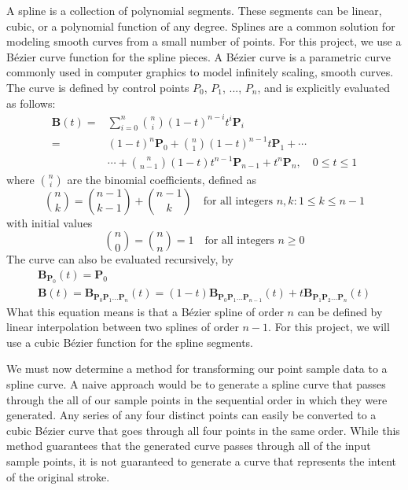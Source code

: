 A spline is a collection of polynomial segments.
These segments can be linear, cubic, or a polynomial function of any degree.
Splines are a common solution for modeling smooth curves from a small number of points.
For this project, we use a B\'{e}zier curve function for the spline pieces.
A B\'{e}zier curve is a parametric curve commonly used in computer graphics to model infinitely scaling, smooth curves.
The curve is defined by control points $P_0$, $P_1$, ..., $P_n$, and is explicitly evaluated as follows:
\begin{align}
  \mathbf{B}(t) = {} &\sum_{i=0}^n {n\choose i}(1 - t)^{n - i}t^i\mathbf{P}_i \\
                = {} &(1 - t)^n\mathbf{P}_0 + {n\choose 1}(1 - t)^{n - 1}t\mathbf{P}_1 + \cdots \\
                  {} &\cdots + {n\choose n - 1}(1 - t)t^{n - 1}\mathbf{P}_{n - 1} + t^n\mathbf{P}_n,\quad 0 \le t \le 1
\end{align}
where $\scriptstyle {n \choose i}$ are the binomial coefficients, defined as
\begin{equation}
\binom nk = \binom{n-1}{k-1} + \binom{n-1}k \quad \text{for all integers }n,k : 1\le k\le n-1
\end{equation}
with initial values 
\begin{equation}
\binom n0 = \binom nn = 1 \quad \text{for all integers } n\ge0
\end{equation}
The curve can also be evaluated recursively, by
\begin{align}
\mathbf{B}_{\mathbf{P}_0}(t) = \mathbf{P}_0 \\
\mathbf{B}(t) = \mathbf{B}_{\mathbf{P}_0\mathbf{P}_1\ldots\mathbf{P}_n}(t) = (1-t)\mathbf{B}_{\mathbf{P}_0\mathbf{P}_1\ldots\mathbf{P}_{n-1}}(t) + t\mathbf{B}_{\mathbf{P}_1\mathbf{P}_2\ldots\mathbf{P}_n}(t)
\end{align}
What this equation means is that a B\'{e}zier spline of order $n$ can be defined by linear interpolation between two splines of order $n - 1$.
For this project, we will use a cubic B\'{e}zier function for the spline segments.

We must now determine a method for transforming our point sample data to a spline curve.
A naive approach would be to generate a spline curve that passes through the all of our sample points in the sequential order in which they were generated.
Any series of any four distinct points can easily be converted to a cubic B\'{e}zier curve that goes through all four points in the same order.
While this method guarantees that the generated curve passes through all of the input sample points, it is not guaranteed to generate a curve that represents the intent of the original stroke.

